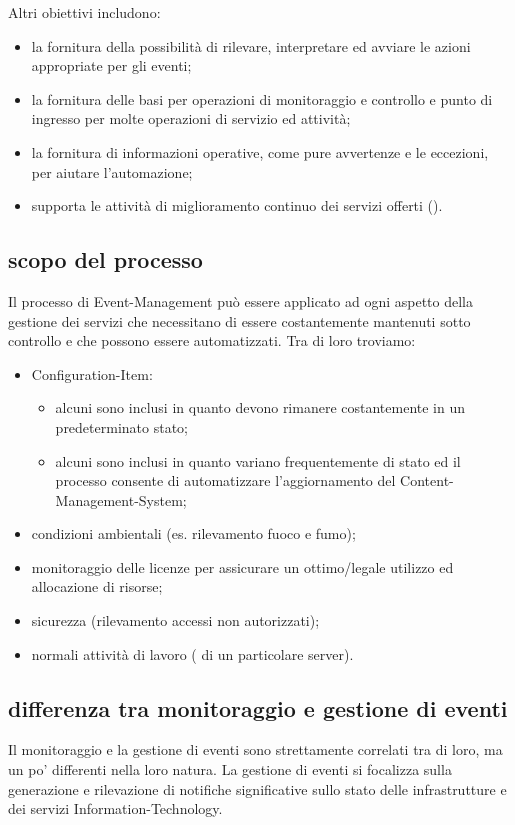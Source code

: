 Altri obiettivi includono:

\begin{itemize}
\item{la fornitura della possibilità di rilevare, interpretare ed avviare le azioni appropriate per gli eventi;}
\item{la fornitura delle basi per operazioni di monitoraggio e controllo e punto di ingresso per molte operazioni di servizio ed attività;}
\item{la fornitura di informazioni operative, come pure avvertenze e le eccezioni, per aiutare l'automazione;}
\item{supporta le attività di miglioramento continuo dei servizi offerti ().}
\end{itemize}

\subsection[Scopo del processo]{scopo del processo}
\label{prc-event-scope}
Il processo di \ac{Event-Management} può essere applicato ad ogni aspetto della gestione dei servizi che necessitano di essere costantemente mantenuti sotto controllo e che possono essere automatizzati. Tra di loro troviamo:

\begin{itemize}
\item{\ac{Configuration-Item}:}
\begin{itemize}
\item{alcuni sono inclusi in quanto devono rimanere costantemente in un predeterminato stato;}
\item{alcuni sono inclusi in quanto variano frequentemente di stato ed il processo consente di automatizzare l'aggiornamento del \ac{Content-Management-System};}
\end{itemize}
\item{condizioni ambientali (es. rilevamento fuoco e fumo);}
\item{monitoraggio delle licenze  per assicurare un ottimo/legale utilizzo ed allocazione di risorse;}
\item{sicurezza (rilevamento accessi non autorizzati);}
\item{normali attività di lavoro ( di un particolare server).}
\end{itemize}

\subsection[Differenza tra monitoraggio e gestione di eventi]{differenza tra monitoraggio e gestione di eventi}
\label{prc-event-difference}
Il monitoraggio e la gestione di eventi sono strettamente correlati tra di loro, ma un po' differenti nella loro natura. La gestione di eventi si focalizza sulla generazione e rilevazione di notifiche significative sullo stato delle infrastrutture e dei servizi \acs{Information-Technology}.

